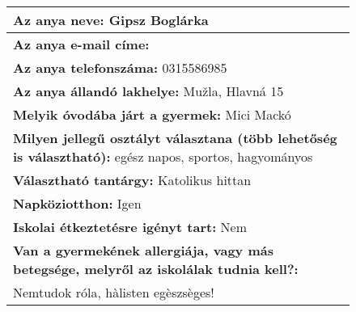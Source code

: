 \documentclass[10pt,a4paper]{article}
\begin{document}
\begin{figure}[!ht]
\begin{tabular}{|m{\textwidth}|}
\hline\vspace{3pt}
\textbf{Az anya neve:} \hspace{0.5cm} Gipsz Boglárka \vspace{3pt} \\
\hline\vspace{3pt}
\textbf{Az anya e-mail címe:} \hspace{0.5cm}   \vspace{3pt} \\
\hline\vspace{3pt}
\textbf{Az anya telefonszáma:} \hspace{0.5cm} 0315586985 \vspace{3pt} \\
\hline\vspace{3pt}
\textbf{Az anya állandó lakhelye:} \hspace{0.5cm} Mužla, Hlavná 15 \vspace{3pt} \\
\hline\vspace{3pt}
\textbf{Melyik óvodába járt a gyermek:} \hspace{0.5cm} Mici Mackó \vspace{3pt} \\
\hline\vspace{3pt}
\textbf{Milyen jellegű osztályt választana (több lehetőség is választható):} \hspace{0.5cm} egész napos, sportos, hagyományos \vspace{3pt} \\
\hline\vspace{3pt}
\textbf{Választható tantárgy:} \hspace{0.5cm} Katolikus hittan \vspace{3pt} \\
\hline\vspace{3pt}
\textbf{Napköziotthon:} \hspace{0.5cm} Igen \vspace{3pt} \\
\hline\vspace{3pt}
\textbf{Iskolai étkeztetésre igényt tart:} \hspace{0.5cm} Nem \vspace{3pt} \\
\hline\vspace{3pt}
\textbf{Van a gyermekének allergiája, vagy más betegsége, melyről az iskolálak tudnia kell?:} \\ \hspace{0.5cm} Nemtudok róla, hàlisten egèszsèges! \vspace{3pt} \\

\end{tabular}
\end{figure}
\end{document}
